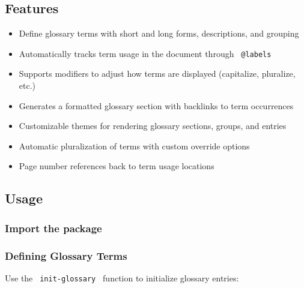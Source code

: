 \subsection{Features}\label{features}

\begin{itemize}
\tightlist
\item
  Define glossary terms with short and long forms, descriptions, and
  grouping
\item
  Automatically tracks term usage in the document through
  \texttt{\ @labels\ }
\item
  Supports modifiers to adjust how terms are displayed (capitalize,
  pluralize, etc.)
\item
  Generates a formatted glossary section with backlinks to term
  occurrences
\item
  Customizable themes for rendering glossary sections, groups, and
  entries
\item
  Automatic pluralization of terms with custom override options
\item
  Page number references back to term usage locations
\end{itemize}

\subsection{Usage}\label{usage}

\subsubsection{Import the package}\label{import-the-package}

\begin{Shaded}
\begin{Highlighting}[]
\end{Highlighting}
\end{Shaded}

\subsubsection{Defining Glossary Terms}\label{defining-glossary-terms}

Use the \texttt{\ init-glossary\ } function to initialize glossary
entries:

